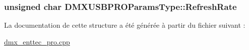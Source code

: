 \hypertarget{struct_d_m_x_u_s_b_p_r_o_params_type_a6258e9923d9bc0725d4b2cc0be515d70}{
\subsubsection[{Refresh\-Rate}]{\setlength{\rightskip}{0pt plus 5cm}unsigned char D\-M\-X\-U\-S\-B\-P\-R\-O\-Params\-Type\-::\-Refresh\-Rate}}\label{struct_d_m_x_u_s_b_p_r_o_params_type_a6258e9923d9bc0725d4b2cc0be515d70}


La documentation de cette structure a été générée à partir du fichier suivant \-:\begin{DoxyCompactItemize}
\item 
\hyperlink{dmx__enttec__pro_8cpp}{dmx\-\_\-enttec\-\_\-pro.\-cpp}\end{DoxyCompactItemize}
